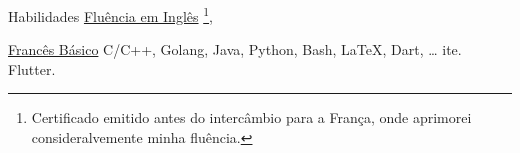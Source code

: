 
\begin{rubric}{Habilidades}
\entry*[Línguas]
    \href{https://drive.google.com/file/d/1PTySqO2pdP8BjxMf1Vgrz0EzpBxw9jYq/view?usp=sharing}{Fluência em Inglês}
    \footnote{Certificado emitido antes do intercâmbio para a França, onde aprimorei consideralvemente minha fluência.},

    \href{https://drive.google.com/file/d/1yjeEiOAcLmwbUxXELqplRyCWaUSi7e8C/view?usp=sharing}{Francês Básico}
    C/C++, Golang, Java, Python, Bash, \LaTeX, Dart, \ldots
\entry*[Databases]
    ite.
    Flutter.
\end{rubric}
